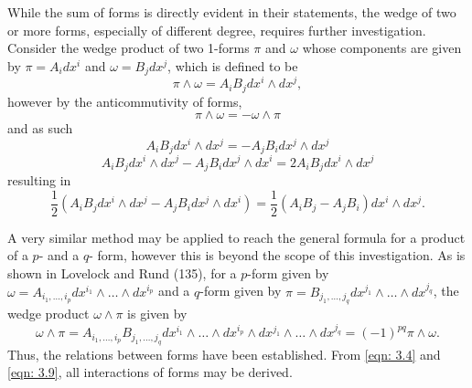 \documentclass[.../main.tex]{subfiles}
\begin{document}
While the sum of forms is directly evident in their statements, the wedge of two or more forms, especially of different degree, requires further investigation. Consider the wedge product of two 1-forms $\pi$ and $\omega$ whose components are given by $\pi = A_{i} dx^{i}$ and $\omega = B_{j} dx^{j}$, which is defined to be
\begin{equation}
	\pi \wedge \omega = A_iB_j dx^i \wedge dx^j,
 \label{eqn: 3.4}		
\end{equation}
however by the anticommutivity of forms, 
\begin{equation}
	\pi \wedge \omega = - \omega \wedge \pi
	\label{eqn: 3.5}	
\end{equation}
and as such 
\begin{equation}
	A_iB_j dx^i \wedge dx^j = -A_jB_i dx^j \wedge dx^j
	\label{eqn: 3.6}	
\end{equation}
\begin{equation}
	A_iB_j dx^i \wedge dx^j - A_jB_i dx^j \wedge dx^i = 2 A_iB_j dx^i \wedge dx^j
	\label{eqn: 3.7}	
\end{equation}
resulting in 
\begin{equation}
	\frac{1}{2} (A_iB_j dx^i \wedge dx^j - A_jB_i dx^j \wedge dx^i) = \frac{1}{2} (A_iB_j - A_jB_i) dx^i \wedge dx^j.
	\label{eqn: 3.8}	
\end{equation}

A very similar method may be applied to reach the general formula for a product of a $p$- and a $q$- form, however this is beyond the scope of this investigation. As is shown in Lovelock and Rund (135)\footnotemark, for a $p$-form given by $\omega = A_{i_1, \dots, i_p} dx^{i_1} \wedge {\dots} \wedge dx^{i_p}$ and a $q$-form given by $\pi = B_{j_1, \dots, j_q} dx^{j_1} \wedge \dots \wedge dx^{j_q}$, the wedge product $\omega \wedge \pi$ is given by 
\begin{equation}
	\omega \wedge \pi = A_{i_1, \dots, i_p} B_{j_1, \dots, j_q} dx^{i_1} \wedge {\dots} \wedge dx^{i_p} \wedge dx^{j_1} \wedge \dots \wedge dx^{j_q} = (-1)^{pq}\pi \wedge \omega.
	\label{eqn: 3.9}	
\end{equation}
Thus, the relations between forms have been established. From \ref{eqn: 3.4} and \ref{eqn: 3.9}, all interactions of forms may be derived.

\end{document}
